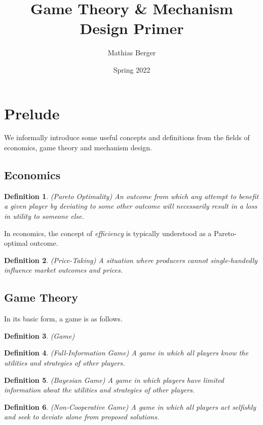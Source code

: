 \documentclass{article}
\title{Game Theory \& Mechanism Design Primer}
\author{Mathias Berger}
\date{Spring 2022}
\newtheorem{definition}{Definition}
\begin{document}
\maketitle

\section{Prelude}

We informally introduce some useful concepts and definitions from the fields of economics, game theory and mechanism design.

\subsection{Economics}

\begin{definition}
(Pareto Optimality) An outcome from which any attempt to benefit a given player by deviating to some other outcome will necessarily result in a loss in utility to someone else.
\end{definition}

In economics, the concept of \textit{efficiency} is typically understood as a Pareto-optimal outcome.

\begin{definition}
(Price-Taking) A situation where producers cannot single-handedly influence market outcomes and prices.
\end{definition}  

\subsection{Game Theory}

In its basic form, a game is as follows.

\begin{definition}
(Game)
\end{definition}

\begin{definition}
(Full-Information Game) A game in which all players know the utilities and strategies of other players.
\end{definition}

\begin{definition}
(Bayesian Game) A game in which players have limited information about the utilities and strategies of other players.
\end{definition}

\begin{definition}
(Non-Cooperative Game) A game in which all players act selfishly and seek to deviate alone from proposed solutions.
\end{definition}
\end{document}
